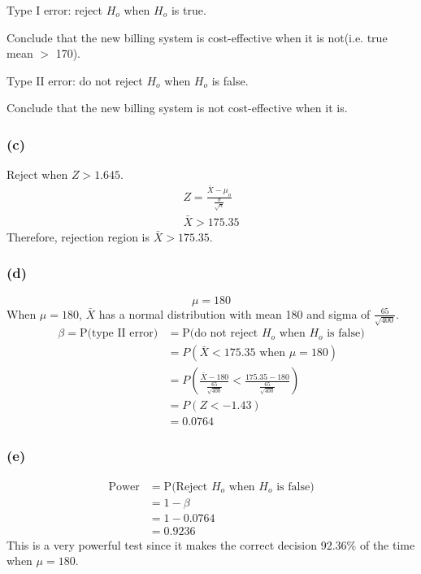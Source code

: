 \documentclass{article}
\begin{document}
        Type I error: reject $H_{o}$ when $H_{o}$ is true.

        Conclude that the new billing system is cost-effective when it is not(i.e. true mean $>$ 170).\par

        Type II error: do not reject $H_{o}$ when $H_{o}$ is false.

        Conclude that the new billing system is not cost-effective when it is.

        \subsubsection*{(c)}
        Reject when $Z > 1.645$.
        \begin{align*}
            Z = \frac{\bar{X}- \mu_{o}}{\frac{\sigma}{\sqrt{n}}}\\
            \bar{X} > 175.35
        \end{align*}
        Therefore, rejection region is $\bar{X} > 175.35$.

        \subsubsection*{(d)}
        \begin{equation*}
            \mu = 180
        \end{equation*}
        When $\mu=180$, $\bar{X}$ has a normal distribution with mean 180 and sigma of $\frac{65}{\sqrt{400}}$.
        \begin{align*}
            \beta = \text{P(type II error)} &= \text{P(do not reject $H_{o}$ when $H_{o}$ is false)}\\
            &= P(\bar{X} < 175.35 \text{ when $\mu = 180$})\\
            &= P(\frac{\bar{X} - 180}{\frac{65}{\sqrt{400}}} < \frac{175.35 - 180}{\frac{65}{\sqrt{400}}})\\
            &= P(Z < -1.43)\\
            &= 0.0764
        \end{align*}

        \subsubsection*{(e)}
        \begin{align*}
            \text{Power} &= \text{P(Reject $H_{o}$ when $H_{o}$ is false)}\\
            &= 1-\beta\\
            &= 1-0.0764\\
            &= 0.9236
        \end{align*}
        This is a very powerful test since it makes the correct decision 92.36$\%$ of the time when $\mu = 180$.
\end{document}
